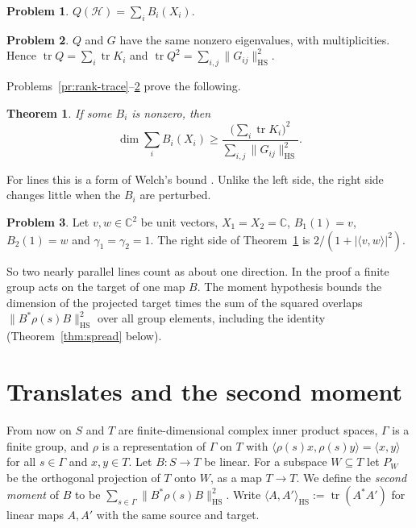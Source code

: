 \documentclass[reqno]{amsart}
\numberwithin{equation}{section}
\theoremstyle{definition}
\newtheorem{problem}{Problem}[section]
\theoremstyle{plain}
\newtheorem{theorem}{Theorem}[section]
\theoremstyle{remark}
\newcommand{\C}{\mathbb{C}}
\newcommand{\Hc}{\mathcal{H}}
\newcommand{\tr}{\operatorname{tr}}
\newcommand{\HS}{\mathrm{HS}}
\begin{document}
\begin{problem}\label{pr:image}
\(Q(\Hc) = \sum_i B_i(X_i)\).
\end{problem}

\begin{problem}\label{pr:gram}
\(Q\) and \(G\) have the same nonzero eigenvalues, with multiplicities.  Hence \(\tr Q = \sum_i \tr K_i\) and \(\tr Q^2 = \sum_{i,j} \lVert G_{ij} \rVert_\HS^2\).
\end{problem}

Problems~\ref{pr:rank-trace}--\ref{pr:gram} prove the following.

\begin{theorem}\label{thm:gram}
If some \(B_i\) is nonzero, then
\[
  \dim \sum_i B_i(X_i) \ge \frac{\bigl( \sum_i \tr K_i \bigr)^2}{\sum_{i,j} \lVert G_{ij} \rVert_\HS^2} .
\]
\end{theorem}

For lines this is a form of Welch's bound \cite{We}.  Unlike the left side, the right side changes little when the \(B_i\) are perturbed.

\begin{problem}\label{pr:two-lines}
Let \(v, w \in \C^2\) be unit vectors, \(X_1 = X_2 = \C\), \(B_1(1) = v\), \(B_2(1) = w\) and \(\gamma_1 = \gamma_2 = 1\).  The right side of Theorem~\ref{thm:gram} is \(2/(1 + \lvert \langle v, w \rangle \rvert^2)\).
\end{problem}

So two nearly parallel lines count as about one direction.  In the proof a finite group acts on the target of one map \(B\).  The moment hypothesis bounds the dimension of the projected target times the sum of the squared overlaps \(\lVert B^*\rho(s)B \rVert_\HS^2\) over all group elements, including the identity (Theorem~\ref{thm:spread} below).

\section{Translates and the second moment}\label{sec:translates}

From now on \(S\) and \(T\) are finite-dimensional complex inner product spaces, \(\Gamma\) is a finite group, and \(\rho\) is a representation of \(\Gamma\) on \(T\) with \(\langle \rho(s)x, \rho(s)y \rangle = \langle x, y \rangle\) for all \(s \in \Gamma\) and \(x, y \in T\).  Let \(B \colon S \to T\) be linear.  For a subspace \(W \subseteq T\) let \(P_W\) be the orthogonal projection of \(T\) onto \(W\), as a map \(T \to T\).  We define the \emph{second moment} of \(B\) to be \(\sum_{s \in \Gamma} \lVert B^*\rho(s)B \rVert_\HS^2\).  Write \(\langle A, A' \rangle_\HS := \tr(A^*A')\) for linear maps \(A, A'\) with the same source and target.
\end{document}
